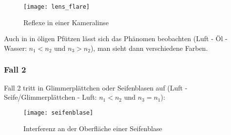 \begin{figure}[H]
	\centering
	\texttt{[image: lens\_flare]}
	\caption{Reflexe in einer Kameralinse}
\end{figure}

Auch in in öligen Pfützen lässt sich das Phänomen beobachten (Luft - Öl - Wasser: $n_1 < n_2$ und $n_3 > n_2$), man sieht dann verschiedene Farben.

\subsubsection{Fall 2}

Fall 2 tritt in Glimmerplättchen oder Seifenblasen auf (Luft - Seife/Glimmerplättchen - Luft: $n_1 < n_2$ und $n_3 = n_1$):

\begin{figure}[H]
	\centering
	\texttt{[image: seifenblase]}
	\caption{Interferenz an der Oberfläche einer Seifenblase}
\end{figure}
